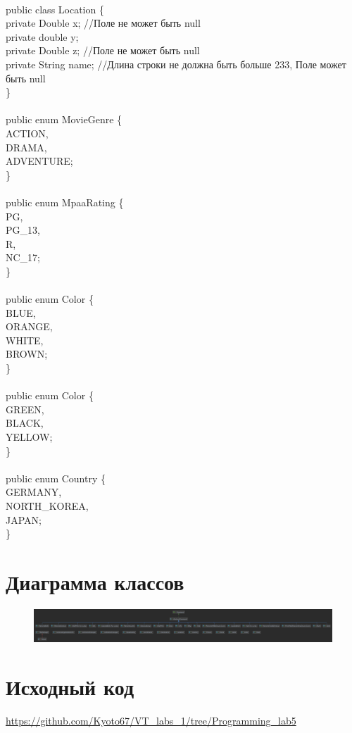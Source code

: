{    \\
    public class Location \{ \\
    private Double x; //Поле не может быть null\\
    private double y;\\
    private Double z; //Поле не может быть null\\
    private String name; //Длина строки не должна быть больше 233, Поле может быть null\\
    \} \\
    \\
    public enum MovieGenre \{ \\
    ACTION,\\
    DRAMA,\\
    ADVENTURE;\\
    \} \\
    \\
    public enum MpaaRating \{ \\
    PG,\\
    PG\_13,\\
    R,\\
    NC\_17;\\
    \} \\
    \\
    public enum Color \{ \\
    BLUE,\\
    ORANGE,\\
    WHITE,\\
    BROWN;\\
    \} \\
    \\
    public enum Color \{ \\
    GREEN,\\
    BLACK,\\
    YELLOW;\\
    \} \\
    \\
    public enum Country \{ \\
    GERMANY,\\
    NORTH\_KOREA,\\
    JAPAN;\\
    \} \\
}
\newpage


\section{Диаграмма классов}

\begin{figure}[H]
    \includegraphics[scale=0.07]{img/diagram}
\end{figure}

\section{Исходный код}
\url{https://github.com/Kyoto67/VT_labs_1/tree/Programming_lab5}